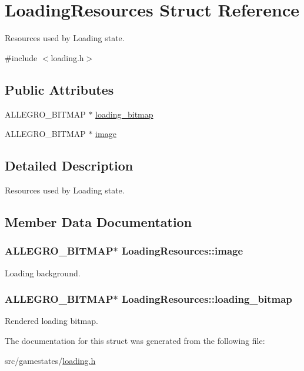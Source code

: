 \hypertarget{structLoadingResources}{\section{Loading\+Resources Struct Reference}
\label{structLoadingResources}
}


Resources used by Loading state.  




{\ttfamily \#include $<$loading.\+h$>$}

\subsection*{Public Attributes}
\begin{DoxyCompactItemize}
\item 
A\+L\+L\+E\+G\+R\+O\+\_\+\+B\+I\+T\+M\+A\+P $\ast$ \hyperlink{structLoadingResources_a42a00bb405801100a63812efdedda99e}{loading\+\_\+bitmap}
\item 
A\+L\+L\+E\+G\+R\+O\+\_\+\+B\+I\+T\+M\+A\+P $\ast$ \hyperlink{structLoadingResources_aae687479515feb22b9db54a8d2021ea3}{image}
\end{DoxyCompactItemize}


\subsection{Detailed Description}
Resources used by Loading state. 

\subsection{Member Data Documentation}
\hypertarget{structLoadingResources_aae687479515feb22b9db54a8d2021ea3}{
\subsubsection[{image}]{\setlength{\rightskip}{0pt plus 5cm}A\+L\+L\+E\+G\+R\+O\+\_\+\+B\+I\+T\+M\+A\+P$\ast$ Loading\+Resources\+::image}}\label{structLoadingResources_aae687479515feb22b9db54a8d2021ea3}
Loading background. \hypertarget{structLoadingResources_a42a00bb405801100a63812efdedda99e}{
\subsubsection[{loading\+\_\+bitmap}]{\setlength{\rightskip}{0pt plus 5cm}A\+L\+L\+E\+G\+R\+O\+\_\+\+B\+I\+T\+M\+A\+P$\ast$ Loading\+Resources\+::loading\+\_\+bitmap}}\label{structLoadingResources_a42a00bb405801100a63812efdedda99e}
Rendered loading bitmap. 

The documentation for this struct was generated from the following file\+:\begin{DoxyCompactItemize}
\item 
src/gamestates/\hyperlink{loading_8h}{loading.\+h}\end{DoxyCompactItemize}
